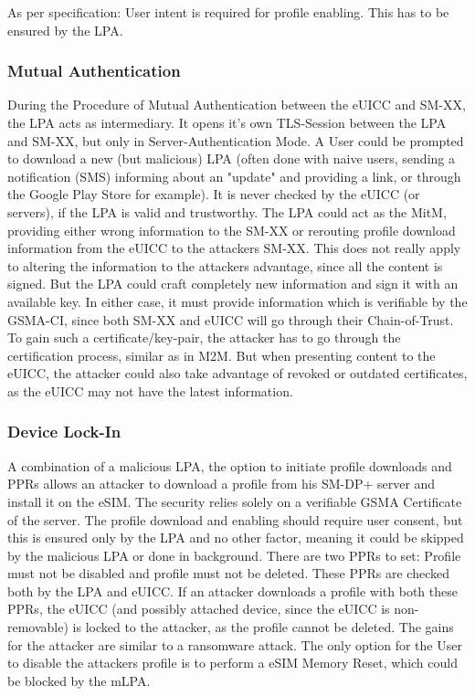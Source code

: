 As per specification:
User intent is required for profile enabling. This has to be ensured by the LPA. 

\subsubsection{Mutual Authentication}
During the Procedure of Mutual Authentication between the eUICC and SM-XX, the LPA acts as intermediary. It opens it's own TLS-Session between the LPA and SM-XX, but only in Server-Authentication Mode. A User could be prompted to download a new (but malicious) LPA (often done with naive users, sending a notification (SMS) informing about an "update" and providing a link, or through the Google Play Store for example). It is never checked by the eUICC (or servers), if the LPA is valid and trustworthy. The LPA could act as the MitM, providing either wrong information to the SM-XX or rerouting profile download information from the eUICC to the attackers SM-XX. 
This does not really apply to altering the information to the attackers advantage, since all the content is signed. But the LPA could craft completely new information and sign it with an available key.
In either case, it must provide information which is verifiable by the GSMA-CI, since both SM-XX and eUICC will go through their Chain-of-Trust. To gain such a certificate/key-pair, the attacker has to go through the certification process, similar as in M2M. But when presenting content to the eUICC, the attacker could also take advantage of revoked or outdated certificates, as the eUICC may not have the latest information.

\subsubsection{Device Lock-In}
A combination of a malicious LPA, the option to initiate profile downloads and PPRs allows an attacker to download a profile from his SM-DP+ server and install it on the eSIM. The security relies solely on a verifiable GSMA Certificate of the server. The profile download and enabling should require user consent, but this is ensured only by the LPA and no other factor, meaning it could be skipped by the malicious LPA or done in background.
There are two PPRs to set: Profile must not be disabled and profile must not be deleted. These PPRs are checked both by the LPA and eUICC. If an attacker downloads a profile with both these PPRs, the eUICC (and possibly attached device, since the eUICC is non-removable) is locked to the attacker, as the profile cannot be deleted. The gains for the attacker are similar to a ransomware attack. 
The only option for the User to disable the attackers profile is to perform a eSIM Memory Reset, which could be blocked by the mLPA.

